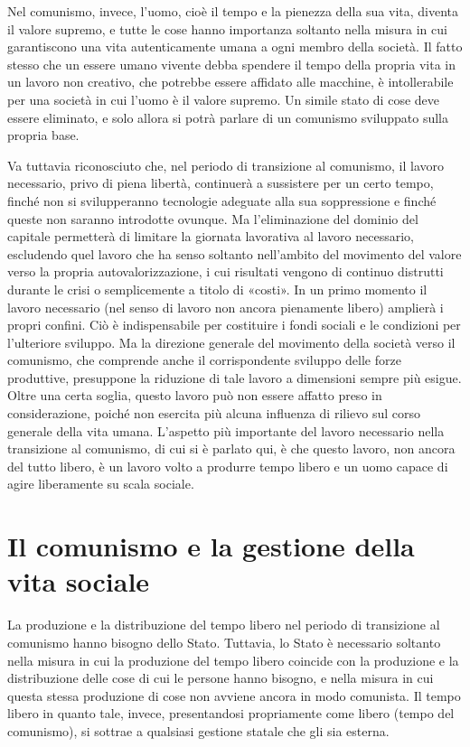 \documentclass[12pt,a4paper,openany]{book}
\begin{document}
Nel comunismo, invece, l'uomo, cioè il tempo e la pienezza della sua vita, diventa il valore supremo, e tutte le cose hanno importanza soltanto nella misura in cui garantiscono una vita autenticamente umana a ogni membro della società. Il fatto stesso che un essere umano vivente debba spendere il tempo della propria vita in un lavoro non creativo, che potrebbe essere affidato alle macchine, è intollerabile per una società in cui l'uomo è il valore supremo. Un simile stato di cose deve essere eliminato, e solo allora si potrà parlare di un comunismo sviluppato sulla propria base.

Va tuttavia riconosciuto che, nel periodo di transizione al comunismo, il lavoro necessario, privo di piena libertà, continuerà a sussistere per un certo tempo, finché non si svilupperanno tecnologie adeguate alla sua soppressione e finché queste non saranno introdotte ovunque. Ma l'eliminazione del dominio del capitale permetterà di limitare la giornata lavorativa al lavoro necessario, escludendo quel lavoro che ha senso soltanto nell'ambito del movimento del valore verso la propria autovalorizzazione, i cui risultati vengono di continuo distrutti durante le crisi o semplicemente a titolo di «costi». In un primo momento il lavoro necessario (nel senso di lavoro non ancora pienamente libero) amplierà i propri confini. Ciò è indispensabile per costituire i fondi sociali e le condizioni per l'ulteriore sviluppo. Ma la direzione generale del movimento della società verso il comunismo, che comprende anche il corrispondente sviluppo delle forze produttive, presuppone la riduzione di tale lavoro a dimensioni sempre più esigue. Oltre una certa soglia, questo lavoro può non essere affatto preso in considerazione, poiché non esercita più alcuna influenza di rilievo sul corso generale della vita umana. L'aspetto più importante del lavoro necessario nella transizione al comunismo, di cui si è parlato qui, è che questo lavoro, non ancora del tutto libero, è un lavoro volto a produrre tempo libero e un uomo capace di agire liberamente su scala sociale.
\ifSubfilesClassLoaded{\setcounter{page}{40}}{}
\section{Il comunismo e la gestione della vita sociale}
\label{sec:07_comunismo_gestione}

La produzione e la distribuzione del tempo libero nel periodo di transizione al comunismo hanno bisogno dello Stato. Tuttavia, lo Stato è necessario soltanto nella misura in cui la produzione del tempo libero coincide con la produzione e la distribuzione delle cose di cui le persone hanno bisogno, e nella misura in cui questa stessa produzione di cose non avviene ancora in modo comunista. Il tempo libero in quanto tale, invece, presentandosi propriamente come libero (tempo del comunismo), si sottrae a qualsiasi gestione statale che gli sia esterna.
\end{document}

